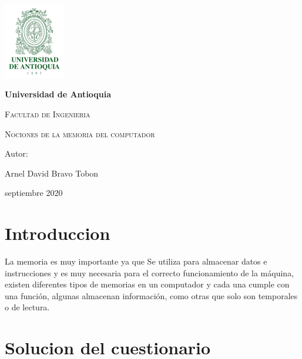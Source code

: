 \documentclass{article}
\begin{document}
\begin{titlepage}
{\includegraphics[width=0.2\textwidth]{udea.png}\par}
\vspace{1cm}
\centering
{\bfseries\LARGE Universidad de Antioquia \par}
\vspace{1cm}
{\scshape\Large Facultad de Ingenieria \par}
\vspace{3cm}
{\scshape\Huge Nociones de la memoria del computador \par}
\vspace{3cm}
\vfill
{\Large Autor: \par}
{\Large Arnel David Bravo Tobon  \par}
\vfill
{\Large septiembre 2020 \par}
\end{titlepage}

\begin{abstract}
    Este documento esta basado en el artículo nociones de la memoria de un computador de Augusto Salazar, se hablará de los tipos de memorias que podemos encontrar en un computador, podremos ver que hay memorias temporales las cuales, tienen gran importancia para que los procesos se realicen de una manera más eficiente , de solo lectura donde se encuentran las instrucciones de la máquina y se compone por la BIOS y el setup que son esenciales para el funcionamiento del computador y las memorias para almacenar datos que son importantes en nuestra vida cotidiana. 
\end{abstract}
\section*{Introduccion}
La memoria es muy importante ya que Se utiliza para almacenar datos e instrucciones y es muy necesaria para el correcto funcionamiento de la máquina, existen diferentes tipos de memorias en un computador y cada una cumple con una función, algunas almacenan información, como otras que solo son temporales o de lectura.
\section*{Solucion del cuestionario}
\end{document}
